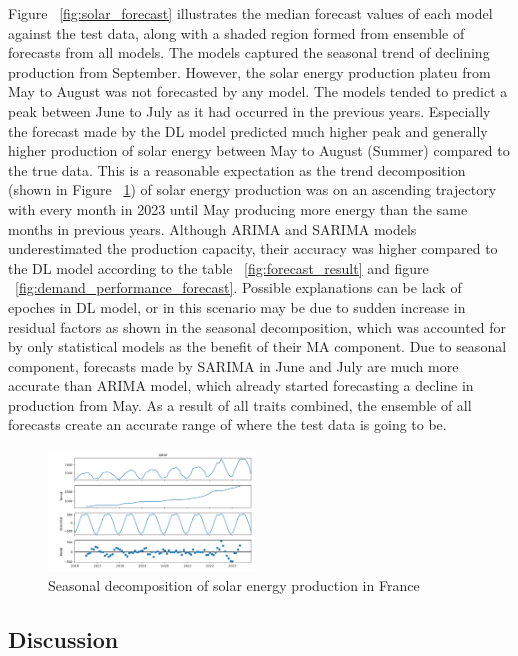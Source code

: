 \documentclass[acmtog]{acmart}
\begin{document}
Figure ~\ref{fig:solar_forecast} illustrates the median forecast values of each model against the test data, along with a shaded region formed from ensemble of forecasts from all models. The models captured the seasonal trend of declining production from September. However, the solar energy production plateu from May to August was not forecasted by any model. The models tended to predict a peak between June to July as it had occurred in the previous years. Especially the forecast made by the DL model predicted much higher peak and generally higher production of solar energy between May to August (Summer) compared to the true data. This is a reasonable expectation as the trend decomposition (shown in Figure ~\ref{fig:seasonal_decompose}) of solar energy production was on an ascending trajectory with every month in 2023 until May producing more energy than the same months in previous years. Although ARIMA and SARIMA models underestimated the production capacity, their accuracy was higher compared to the DL model according to the table ~\ref{fig:forecast_result} and figure ~\ref{fig:demand_performance_forecast}. Possible explanations can be lack of epoches in DL model, or in this scenario may be due to sudden increase in residual factors as shown in the seasonal decomposition, which was accounted for by only statistical models as the benefit of their MA component. Due to seasonal component, forecasts made by SARIMA in June and July are much more accurate than ARIMA model, which already started forecasting a decline in production from May. As a result of all traits combined, the ensemble of all forecasts create an accurate range of where the test data is going to be.

\begin{figure}[htb!]
    \centering
    \includegraphics[width=0.49\textwidth]{figures/Figure_4.png}
    \caption{Seasonal decomposition of solar energy production in France}
    \label{fig:seasonal_decompose} %
\end{figure}

\subsection{Discussion}
\end{document}
